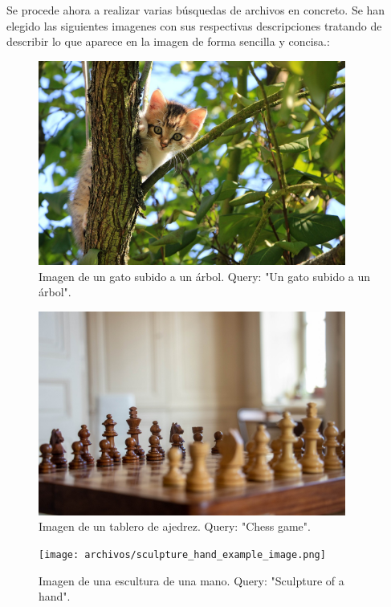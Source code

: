 Se procede ahora a realizar varias búsquedas de archivos en concreto. Se han elegido las siguientes imagenes con sus respectivas descripciones tratando de describir lo que aparece en la imagen de forma sencilla y concisa.:
\begin{figure}[H]
\centering
\includegraphics[width=0.9\textwidth]{archivos/cat_example_image.png}
\caption[Imagen de un gato subido a un árbol]{Imagen de un gato subido a un árbol. Query: "Un gato subido a un árbol".}
\label{fig:cat_example_image}
\end{figure}

\begin{figure}[H]
\centering
\includegraphics[width=0.9\textwidth]{archivos/chess_example_image.png}
\caption[Imagen de un tablero de ajedrez]{Imagen de un tablero de ajedrez. Query: "Chess game".}
\label{fig:cat_example_image}
\end{figure}

\begin{figure}[H]
\centering
\texttt{[image: archivos/sculpture\_hand\_example\_image.png]}
\caption[Imagen de una escultura de una mano]{Imagen de una escultura de una mano. Query: "Sculpture of a hand".}
\label{fig:cat_example_image}
\end{figure}


